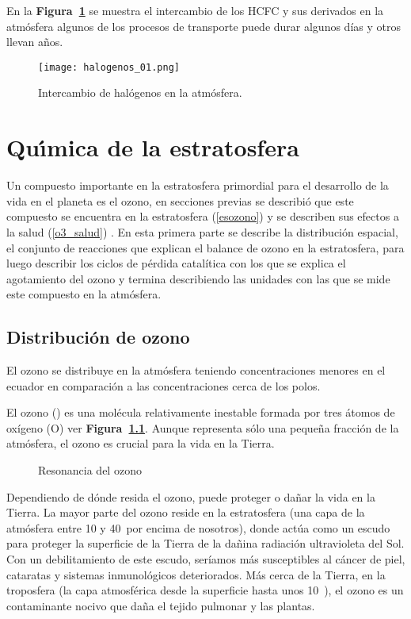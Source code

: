 En la \textbf{Figura~\ref{halo_01}} se muestra el intercambio de los HCFC y sus derivados en la atmósfera algunos de los procesos de transporte puede durar algunos días y otros llevan años.

\begin{figure}[htbp]
\begin{center}
\texttt{[image: halogenos\_01.png]}
\caption{Intercambio de halógenos en la atmósfera.}
\label{halo_01}
\end{center}
\end{figure}

%  
%  

\chapter{Qu\'{\i}mica de la estratosfera}

Un compuesto importante en la estratosfera primordial para el desarrollo de la vida en el planeta es el ozono, en secciones previas se describió que este compuesto se encuentra en la estratosfera (\ref{esozono})  y se describen sus efectos a la salud (\ref{o3_salud}) .  En esta primera parte se describe la distribución espacial, el conjunto de reacciones que explican el balance de ozono en la estratosfera, para luego describir los ciclos de pérdida catalítica con los que se explica el agotamiento del ozono y termina describiendo las unidades con las que se mide este compuesto en la atmósfera.

\section{Distribución de ozono}
El ozono se distribuye en la atmósfera teniendo concentraciones menores en el ecuador en comparación a las concentraciones cerca de los polos.

El ozono () es una molécula relativamente inestable formada por tres átomos de oxígeno (O) ver \textbf{Figura~\ref{reso3}}. Aunque representa sólo una pequeña fracción de la atmósfera, el ozono es crucial para la vida en la Tierra.
\begin{figure}[htbp]
\begin{center}
\caption{Resonancia del ozono}
\label{reso3}
\end{center}
\end{figure}


Dependiendo de dónde resida el ozono, puede proteger o dañar la vida en la Tierra. La mayor parte del ozono reside en la estratosfera (una capa de la atmósfera entre 10 y 40\kilo\metre\, por encima de nosotros), donde actúa como un escudo para proteger la superficie de la Tierra de la dañina radiación ultravioleta del Sol. Con un debilitamiento de este escudo, seríamos más susceptibles al cáncer de piel, cataratas y sistemas inmunológicos deteriorados. Más cerca de la Tierra, en la troposfera (la capa atmosférica desde la superficie hasta unos 10\kilo\metre\, ), el ozono es un contaminante nocivo que daña el tejido pulmonar y las plantas.

